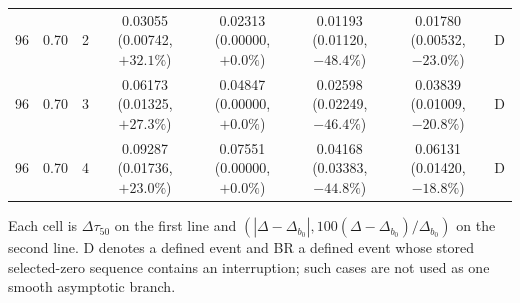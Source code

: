 \begin{longtable}{rrrccccc}
96 & 0.70 & 2 & \shortstack{0.03055\\(0.00742, $+32.1\%$)} & \shortstack{0.02313\\(0.00000, $+0.0\%$)} & \shortstack{0.01193\\(0.01120, $-48.4\%$)} & \shortstack{0.01780\\(0.00532, $-23.0\%$)} & D \\
96 & 0.70 & 3 & \shortstack{0.06173\\(0.01325, $+27.3\%$)} & \shortstack{0.04847\\(0.00000, $+0.0\%$)} & \shortstack{0.02598\\(0.02249, $-46.4\%$)} & \shortstack{0.03839\\(0.01009, $-20.8\%$)} & D \\
96 & 0.70 & 4 & \shortstack{0.09287\\(0.01736, $+23.0\%$)} & \shortstack{0.07551\\(0.00000, $+0.0\%$)} & \shortstack{0.04168\\(0.03383, $-44.8\%$)} & \shortstack{0.06131\\(0.01420, $-18.8\%$)} & D \\
\bottomrule
\end{longtable}
\noindent\footnotesize Each cell is $\Delta\tau_{50}$ on the first line and $(|\Delta-\Delta_{b_0}|,100(\Delta-\Delta_{b_0})/\Delta_{b_0})$ on the second line. D denotes a defined event and BR a defined event whose stored selected-zero sequence contains an interruption; such cases are not used as one smooth asymptotic branch.
\endgroup
